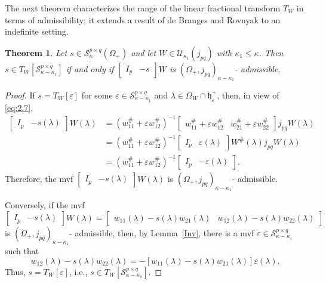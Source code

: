 \documentclass[12pt,twoside,a4paper]{amsart}
\newtheorem{thm}{Theorem}[section]
\theoremstyle{definition}
\numberwithin{equation}{section}
\begin{document}
The next theorem characterizes the range of the linear fractional
transform $T_W$ in terms of admissibility; it extends a result of de
Branges and Rovnyak to an indefinite setting.
\begin{thm}\label{thm:3.3}
Let $s\in {\mathcal S}_{\kappa}^{p\times q}(\Omega_+)$ and let $W\in
{{\mathcal U}}_{\kappa_1}(j_{pq})$ with $\kappa_1\leq\kappa$. Then $s\in
T_W[{\mathcal S}_{\kappa-\kappa_1}^{p\times q}]$ if and only if
$\begin{bmatrix}I_p &-s\end{bmatrix}W$ is $(\Omega_+
,j_{pq})_{\kappa-\kappa_1}$- admissible.
\end{thm}
\begin{proof}
If $s=T_W[\varepsilon]$ for some $\varepsilon\in {\mathcal
S}_{\kappa-\kappa_1}^{p\times q}$ and  ${\lambda} \in \Omega_W\cap
{{\mathfrak h}}_\varepsilon^+$, then, in view of \eqref{eq:2.7},
\begin{equation}\label{eq:2.100}
\begin{split}
\begin{bmatrix}I_{p} & -s(\lambda)\end{bmatrix}W(\lambda) &=(w_{11}^\# +\varepsilon
w_{12}^\#)^{-1}
\begin{bmatrix}w_{11}^\#+\varepsilon w^\#_{12} & w_{21}^\#+\varepsilon w^\#_{22}\end{bmatrix}
j_{pq}W(\lambda)\\
&=(w_{11}^\# +\varepsilon w_{12}^\#)^{-1}
\begin{bmatrix}I_{p} & \varepsilon(\lambda)\end{bmatrix}
W^\# (\lambda)j_{pq}W(\lambda)\\
&=(w_{11}^\# +\varepsilon w_{12}^\#)^{-1}
\begin{bmatrix}I_{p} & -\varepsilon(\lambda)\end{bmatrix}.
\end{split}
\end{equation}
Therefore, the mvf $\begin{bmatrix}I_{p} & -s(\lambda)\end{bmatrix}
W(\lambda)$ is $(\Omega_+,j_{pq})_{\kappa-\kappa_1}$- admissible.

Conversely, if the mvf
$$
\begin{bmatrix}I_{p} &
-s(\lambda)\end{bmatrix}W(\lambda)=\begin{bmatrix}
w_{11}(\lambda)-s(\lambda)w_{21}(\lambda)&
w_{12}(\lambda)-s(\lambda)w_{22}(\lambda)\end{bmatrix}
$$
is $(\Omega_+, j_{pq})_{\kappa-\kappa_1}$- admissible, then, by
Lemma~\ref{Inv},  there is a mvf $\varepsilon\in {\mathcal
S}_{\kappa-\kappa_1}^{p\times q}$ such that
\[
w_{12}(\lambda)-s(\lambda)w_{22}(\lambda)
=-[w_{11}(\lambda)-s(\lambda)w_{21}(\lambda)]\varepsilon(\lambda).
\]
Thus, $s=T_W[\varepsilon]$, i.e., $s\in T_W[{\mathcal
S}_{\kappa-\kappa_1}^{p\times q}]$.
\end{proof}
\end{document}
